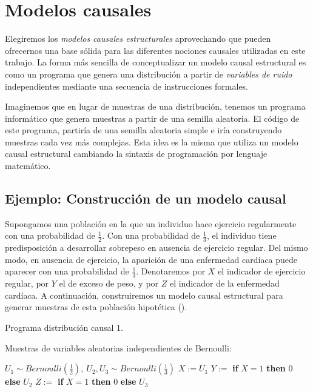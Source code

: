 \documentclass[oneside,openright,titlepage,numbers=noenddot,openany,headinclude,footinclude=true,
cleardoublepage=empty,abstractoff,BCOR=5mm,paper=a4,fontsize=12pt,main=spanish]{scrreprt}
\begin{document}
\section{Modelos causales}

Elegiremos los \textit{modelos causales estructurales} aprovechando que pueden ofrecernos una base sólida para las diferentes nociones causales utilizadas en este trabajo. La forma más sencilla de conceptualizar un modelo causal estructural es como un programa que genera una distribución a partir de \textit{variables de ruido} independientes mediante una secuencia de instrucciones formales. 

Imaginemos que en lugar de muestras de una distribución, tenemos un programa informático que genera muestras a partir de una semilla aleatoria. El código de este programa, partiría de una semilla aleatoria simple e iría construyendo muestras cada vez más complejas. Esta idea es la misma que utiliza un modelo causal estructural cambiando la sintaxis de programación por lenguaje matemático.

\subsection{Ejemplo: Construcción de un modelo causal}

\label{subsec:sobrepeso}

Supongamos una población en la que un individuo hace ejercicio regularmente con una probabilidad de $\frac{1}{2}$. Con una probabilidad de $\frac{1}{3}$, el individuo tiene predisposición a desarrollar sobrepeso en ausencia de ejercicio regular. Del mismo modo, en ausencia de ejercicio, la aparición de una enfermedad cardíaca puede aparecer con una probabilidad de $\frac{1}{3}$. Denotaremos por $X$ el indicador de ejercicio regular, por $Y$ el de exceso de peso, y por $Z$ el indicador de la enfermedad cardíaca. A continuación, construiremos un modelo causal estructural para generar muestras de esta población hipotética (\cite{fairnesslearning2019}).

\clearpage

\begin{algorithm}[h]
\caption{Programa distribución causal 1.}
    Muestras de variables aleatorias independientes de Bernoulli:
    
    $U_1 \sim  Bernoulli\left(\frac{1}{2}\right), \ U_2,U_3 \sim  Bernoulli\left(\frac{1}{3}\right)$\;
    $X:=U_1$\;
    $Y:=$ \textbf{if} $X=1$ \textbf{then} $0$ \textbf{else} $U_2$\;
    $Z:=$ \textbf{if} $X=1$ \textbf{then} $0$ \textbf{else} $U_3$\;
    \label{alg:programa2}
\end{algorithm}
\end{document}
